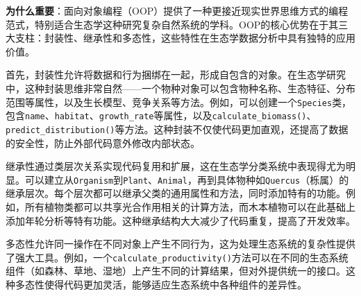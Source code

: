 \documentclass[
]{book}
\newenvironment{Shaded}{\begin{snugshade}}{\end{snugshade}}
\newcommand{\AttributeTok}[1]{\textcolor[rgb]{0.13,0.29,0.53}{#1}}
\newcommand{\CommentTok}[1]{\textcolor[rgb]{0.56,0.35,0.01}{\textit{#1}}}
\newcommand{\ControlFlowTok}[1]{\textcolor[rgb]{0.13,0.29,0.53}{\textbf{#1}}}
\newcommand{\DecValTok}[1]{\textcolor[rgb]{0.00,0.00,0.81}{#1}}
\newcommand{\FunctionTok}[1]{\textcolor[rgb]{0.13,0.29,0.53}{\textbf{#1}}}
\newcommand{\NormalTok}[1]{#1}
\newcommand{\OtherTok}[1]{\textcolor[rgb]{0.56,0.35,0.01}{#1}}
\newcommand{\SpecialCharTok}[1]{\textcolor[rgb]{0.81,0.36,0.00}{\textbf{#1}}}
\newcommand{\StringTok}[1]{\textcolor[rgb]{0.31,0.60,0.02}{#1}}
\begin{document}
\begin{Shaded}
\end{Shaded}

\textbf{为什么重要}：面向对象编程（OOP）提供了一种更接近现实世界思维方式的编程范式，特别适合生态学这种研究复杂自然系统的学科。OOP的核心优势在于其三大支柱：封装性、继承性和多态性，这些特性在生态学数据分析中具有独特的应用价值。

首先，封装性允许将数据和行为捆绑在一起，形成自包含的对象。在生态学研究中，这种封装思维非常自然------一个物种对象可以包含物种名称、生态特征、分布范围等属性，以及生长模型、竞争关系等方法。例如，可以创建一个\texttt{Species}类，包含\texttt{name}、\texttt{habitat}、\texttt{growth\_rate}等属性，以及\texttt{calculate\_biomass()}、\texttt{predict\_distribution()}等方法。这种封装不仅使代码更加直观，还提高了数据的安全性，防止外部代码意外修改内部状态。

继承性通过类层次关系实现代码复用和扩展，这在生态学分类系统中表现得尤为明显。可以建立从\texttt{Organism}到\texttt{Plant}、\texttt{Animal}，再到具体物种如\texttt{Quercus}（栎属）的继承层次。每个层次都可以继承父类的通用属性和方法，同时添加特有的功能。例如，所有植物类都可以共享光合作用相关的计算方法，而木本植物可以在此基础上添加年轮分析等特有功能。这种继承结构大大减少了代码重复，提高了开发效率。

多态性允许同一操作在不同对象上产生不同行为，这为处理生态系统的复杂性提供了强大工具。例如，一个\texttt{calculate\_productivity()}方法可以在不同的生态系统组件（如森林、草地、湿地）上产生不同的计算结果，但对外提供统一的接口。这种多态性使得代码更加灵活，能够适应生态系统中各种组件的差异性。
\end{document}
